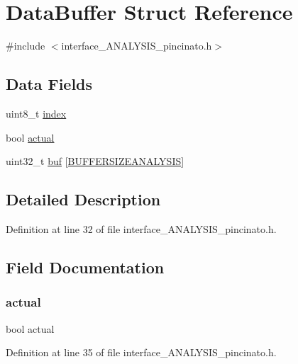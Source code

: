 \hypertarget{struct_data_buffer}{}\section{Data\+Buffer Struct Reference}
\label{struct_data_buffer}


{\ttfamily \#include $<$interface\+\_\+\+A\+N\+A\+L\+Y\+S\+I\+S\+\_\+pincinato.\+h$>$}

\subsection*{Data Fields}
\begin{DoxyCompactItemize}
\item 
uint8\+\_\+t \mbox{\hyperlink{struct_data_buffer_aae5a12e607d0f782506d9e6ec6179c64}{index}}
\item 
bool \mbox{\hyperlink{struct_data_buffer_a28b95a576c2cbf8b46a32c572ebd23b9}{actual}}
\item 
uint32\+\_\+t \mbox{\hyperlink{struct_data_buffer_a879b8a6fa7f2626814e9c149bdfc3139}{buf}} \mbox{[}\mbox{\hyperlink{interface___a_n_a_l_y_s_i_s__pincinato_8h_a8d58dfb2133bff91e140c30b2c72ed04}{B\+U\+F\+F\+E\+R\+S\+I\+Z\+E\+A\+N\+A\+L\+Y\+S\+IS}}\mbox{]}
\end{DoxyCompactItemize}


\subsection{Detailed Description}


Definition at line 32 of file interface\+\_\+\+A\+N\+A\+L\+Y\+S\+I\+S\+\_\+pincinato.\+h.



\subsection{Field Documentation}
\mbox{\label{struct_data_buffer_a28b95a576c2cbf8b46a32c572ebd23b9}} 
\subsubsection{\texorpdfstring{actual}{actual}}
{\footnotesize\ttfamily bool actual}



Definition at line 35 of file interface\+\_\+\+A\+N\+A\+L\+Y\+S\+I\+S\+\_\+pincinato.\+h.


